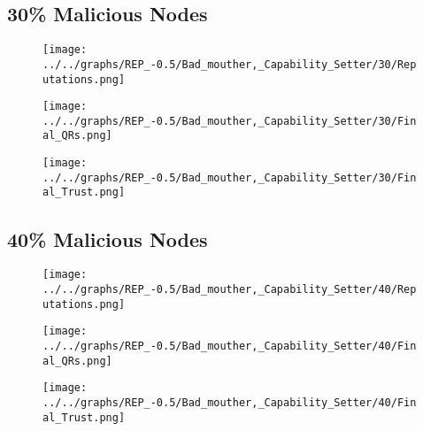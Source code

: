 \begin{minipage}[t]{0.49\columnwidth}
\subsection*{30\% Malicious Nodes}
    \begin{figure}[H]
        \centering
        \texttt{[image: ../../graphs/REP\_-0.5/Bad\_mouther,\_Capability\_Setter/30/Reputations.png]}
    \end{figure}
    \begin{figure}[H]
        \centering
        \texttt{[image: ../../graphs/REP\_-0.5/Bad\_mouther,\_Capability\_Setter/30/Final\_QRs.png]}
    \end{figure}
\end{minipage}
\begin{minipage}[t]{0.49\columnwidth}
    \begin{figure}[H]
        \centering
        \texttt{[image: ../../graphs/REP\_-0.5/Bad\_mouther,\_Capability\_Setter/30/Final\_Trust.png]}
    \end{figure}
\end{minipage}

\begin{minipage}[t]{0.49\columnwidth}
\subsection*{40\% Malicious Nodes}
    \begin{figure}[H]
        \centering
        \texttt{[image: ../../graphs/REP\_-0.5/Bad\_mouther,\_Capability\_Setter/40/Reputations.png]}
    \end{figure}
    \begin{figure}[H]
        \centering
        \texttt{[image: ../../graphs/REP\_-0.5/Bad\_mouther,\_Capability\_Setter/40/Final\_QRs.png]}
    \end{figure}
\end{minipage}
\begin{minipage}[t]{0.49\columnwidth}
    \begin{figure}[H]
        \centering
        \texttt{[image: ../../graphs/REP\_-0.5/Bad\_mouther,\_Capability\_Setter/40/Final\_Trust.png]}
    \end{figure}
\end{minipage}

